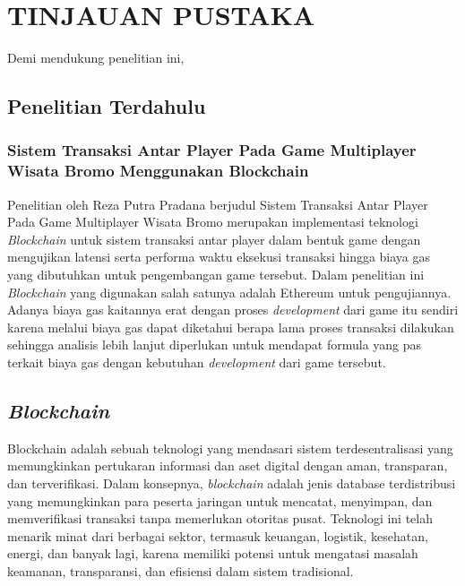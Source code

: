 \chapter{TINJAUAN PUSTAKA}
\label{chap:tinjauanpustaka}


Demi mendukung penelitian ini, \lipsum[1][1-5]

\section{Penelitian Terdahulu}
\label{sec:penelitianterdahulu}

\subsection{Sistem Transaksi Antar Player Pada Game Multiplayer Wisata Bromo Menggunakan Blockchain}
\label{subsec:sistemtransaksiblockchainreza}
Penelitian oleh Reza Putra Pradana berjudul Sistem Transaksi Antar Player Pada Game Multiplayer Wisata
Bromo merupakan implementasi teknologi \emph{Blockchain} untuk sistem transaksi antar player dalam bentuk game
dengan mengujikan latensi serta performa waktu eksekusi transaksi hingga biaya gas yang dibutuhkan untuk
pengembangan game tersebut. Dalam penelitian ini \emph{Blockchain} yang digunakan salah satunya adalah Ethereum untuk pengujiannya.
Adanya biaya gas kaitannya erat dengan proses \emph{development} dari game itu sendiri karena melalui biaya gas
dapat diketahui berapa lama proses transaksi dilakukan sehingga analisis lebih lanjut diperlukan untuk mendapat formula yang pas terkait biaya gas dengan kebutuhan \emph{development} dari game tersebut.

\section{\emph{Blockchain}}
\label{sec:blockchain}
Blockchain adalah sebuah teknologi yang mendasari sistem terdesentralisasi yang memungkinkan pertukaran informasi dan aset digital dengan aman, transparan, dan terverifikasi.
Dalam konsepnya, \emph{blockchain} adalah jenis database terdistribusi yang memungkinkan para peserta jaringan untuk mencatat, menyimpan, dan memverifikasi transaksi tanpa memerlukan otoritas pusat.
Teknologi ini telah menarik minat dari berbagai sektor, termasuk keuangan, logistik, kesehatan, energi, dan banyak lagi, karena memiliki potensi untuk mengatasi masalah keamanan, transparansi,
dan efisiensi dalam sistem tradisional. \parencite{nakamoto2008bitcoin}


